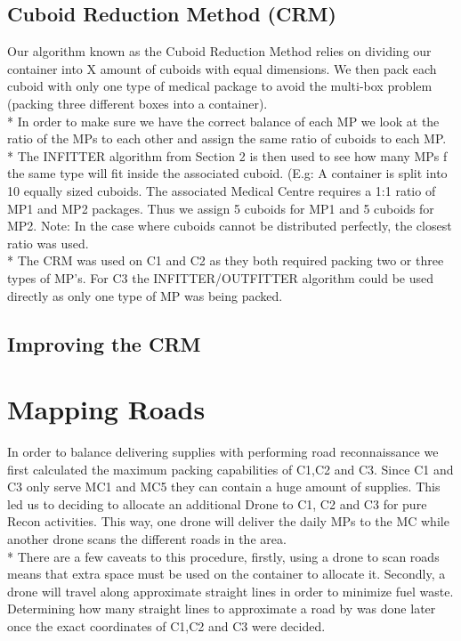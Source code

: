 \documentclass[a4paper,12pt]{article}
\begin{document}
\subsection{Cuboid Reduction Method (CRM)}
Our algorithm known as the Cuboid Reduction Method relies on dividing our container into X amount of cuboids with equal dimensions. We then pack each cuboid with only one
type of medical package to avoid the multi-box problem (packing three different boxes into a container).\\* In order to make sure we have the correct balance of each MP we
look at the ratio of the MPs to each other and assign the same ratio of cuboids to each MP.\\*
The INFITTER algorithm from Section 2 is then used to see how many MPs f the same type will fit inside the associated cuboid.
(E.g: A container is split into 10 equally sized cuboids. The associated Medical Centre requires a 1:1 ratio of MP1 and MP2 packages. Thus we assign 5 cuboids for MP1 and 5 cuboids for MP2.
Note: In the case where cuboids cannot be distributed perfectly, the closest ratio was used.
\\*
The CRM was used on C1 and C2 as they both required packing two or three types of MP's. For C3 the INFITTER/OUTFITTER algorithm could be used directly as only one type of MP was being packed.
\subsection{Improving the CRM}

\newpage

\section{Mapping Roads}
In order to balance delivering supplies with performing road reconnaissance we first calculated the maximum packing capabilities of C1,C2 and C3.
Since C1 and C3 only serve MC1 and MC5 they can contain a huge amount of supplies. This led us to deciding to allocate an additional Drone to C1, C2 and C3 for pure Recon activities.
This way, one drone will deliver the daily MPs to the MC while another drone scans the different roads in the area.\\*
There are a few caveats to this procedure, firstly, using a drone to scan roads means that extra space must be used on the container to allocate it.
Secondly, a drone will travel along approximate straight lines in order to minimize fuel waste. Determining how many straight lines to approximate a road by was done later once the exact coordinates of C1,C2 and C3 were decided.
\end{document}
